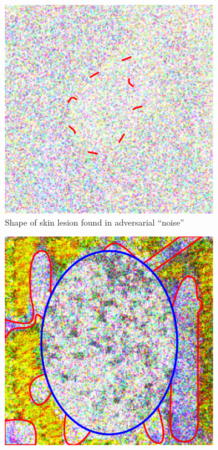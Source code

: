 \documentclass[10pt,twocolumn,letterpaper]{article}
\begin{document}
        \begin{figure}[h]
          \centering
          \begin{subfigure}{.4\linewidth}
            \centering
            \includegraphics[width=\linewidth]{graphics/ResNet-50/LesionOutline.pdf}
            \caption{Shape of skin lesion found in adversarial ``noise''\\}
            \label{LesionShape}
          \end{subfigure}
          \begin{subfigure}{.4\linewidth}
            \centering
            \includegraphics[width=\linewidth]{graphics/ResNet-50/EyeShapeDivergence.pdf}

\end{subfigure}
\end{figure}
\end{document}
